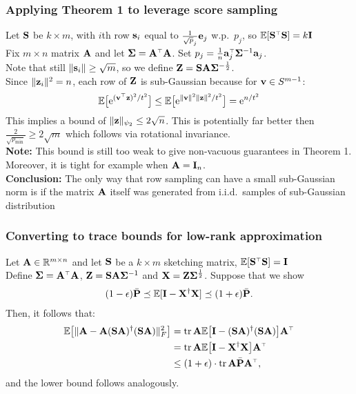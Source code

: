 \documentclass[10pt]{beamer}
\begin{document}
  \begin{frame}
    \frametitle{Applying Theorem 1 to leverage score sampling}
    Let $\S$ be $k\times m$, with $i$th row $\s_i$ equal to
    $\frac1{\sqrt p_{j}}\e_j$ w.p.~$p_j$, so $\E[\S^\top\S]=k\I$\\
    Fix $m\times n$ matrix $\A$ and let $\Sigmab=\A^\top\A$. Set $p_j
    = \frac1n\a_j^\top\Sigmab^{-1}\a_j$.\\
Note that still $\|\s_i\|\geq \sqrt m$, so we define $\Z=\S\A\Sigmab^{-\frac12}$.\\
Since $\|\z_i\|^2=n$, each row of $\Z$ is sub-Gaussian because for $\v\in S^{m-1}$:
  \begin{align*}
    \E\big[\ee^{(\v^\top\z)^2/t^2}\big]
    \leq \E\big[\ee^{\|\v\|^2\|\z\|^2/t^2}\big] =\ee^{n/t^2}
  \end{align*}
  This implies a bound of $\|\z\|_{\psi_2}\leq 2\sqrt n$. This is
  potentially far better then $\frac2{\sqrt{p_{\min}}}\geq 2\sqrt m$ which
  follows via rotational invariance.\\[5mm]

\textbf{Note:}  This bound is still too weak to give non-vacuous
guarantees in Theorem 1. Moreover, it is tight for example when
$\A=\I_n$.\\[4mm]
\textbf{Conclusion:} The only way that row sampling can have a small
sub-Gaussian norm is if the matrix $\A$ itself was generated from
i.i.d.~samples of sub-Gaussian distribution

 \end{frame}


\begin{frame}
  \frametitle{Converting to trace bounds for low-rank approximation}
  Let $\A\in\R^{m\times n}$ and let $\S$ be a $k\times m$ sketching
  matrix, $\E[\S^\top\S]=\I$\\
    Define $\Sigmab=\A^\top\A$, $\Z=\S\A\Sigmab^{-1}$ and $\X=\Z\Sigmab^{\frac12}$. Suppose
    that we show
    \begin{align*}
      (1-\epsilon)\bar\P\preceq \E[\I-\X^\dagger\X]\preceq(1+\epsilon)\bar\P.
    \end{align*}
    Then, it follows that:
    \begin{align*}
      \E\big[\|\A-\A(\S\A)^\dagger(\S\A)\|_F^2\big]
      &= \tr\,\A\E\big[\I-(\S\A)^\dagger(\S\A)\big]\A^\top\\
      &= \tr\,\A\E\big[\I-\X^\dagger\X\big]\A^\top\\
       &\leq (1+\epsilon)\cdot \tr\,\A\bar\P\A^\top,
    \end{align*}
    and the lower bound follows analogously.
  \end{frame}
\end{document}
